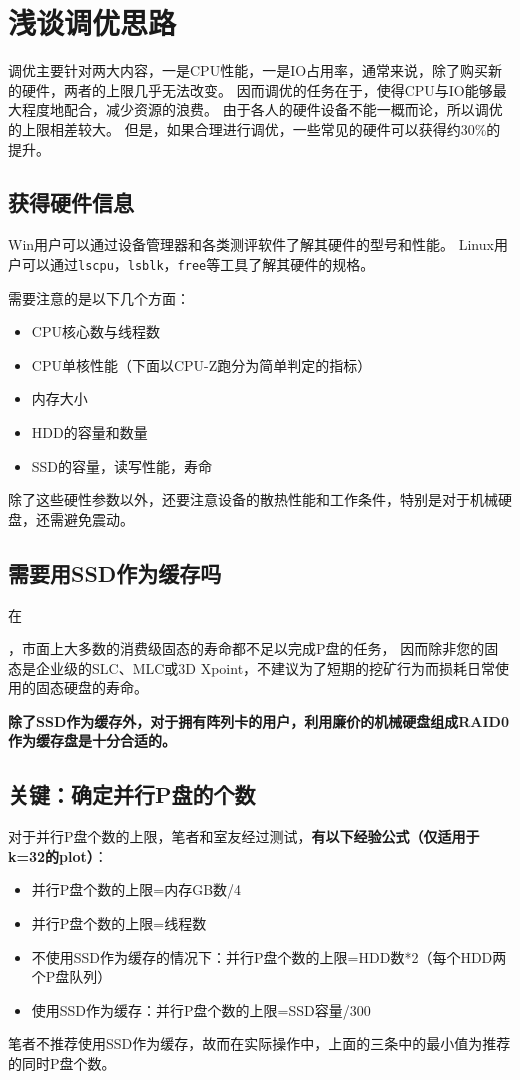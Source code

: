 \documentclass[cn,black,12pt,normal]{elegantnote}
\begin{document}
\section{浅谈调优思路}
调优主要针对两大内容，一是CPU性能，一是IO占用率，通常来说，除了购买新的硬件，两者的上限几乎无法改变。
因而调优的任务在于，使得CPU与IO能够最大程度地配合，减少资源的浪费。
由于各人的硬件设备不能一概而论，所以调优的上限相差较大。
但是，如果合理进行调优，一些常见的硬件可以获得约30\%的提升。

\subsection{获得硬件信息}
Win用户可以通过设备管理器和各类测评软件了解其硬件的型号和性能。
Linux用户可以通过\lstinline{lscpu}，\lstinline{lsblk}，\lstinline{free}等工具了解其硬件的规格。

需要注意的是以下几个方面：
\begin{itemize}
    \item CPU核心数与线程数
    \item CPU单核性能（下面以CPU-Z跑分为简单判定的指标）
    \item 内存大小
    \item HDD的容量和数量
    \item SSD的容量，读写性能，寿命
\end{itemize}

除了这些硬性参数以外，还要注意设备的散热性能和工作条件，特别是对于机械硬盘，还需避免震动。

\subsection{需要用SSD作为缓存吗}

在\date{\zhtoday}，市面上大多数的消费级固态的寿命都不足以完成P盘的任务，
因而除非您的固态是企业级的SLC、MLC或3D Xpoint，不建议为了短期的挖矿行为而损耗日常使用的固态硬盘的寿命。

\textbf{除了SSD作为缓存外，对于拥有阵列卡的用户，利用廉价的机械硬盘组成RAID0作为缓存盘是十分合适的。}

\subsection{关键：确定并行P盘的个数}

对于并行P盘个数的上限，笔者和室友经过测试，\textbf{有以下经验公式（仅适用于k=32的plot）}：
\begin{itemize}
    \item 并行P盘个数的上限=内存GB数/4
    \item 并行P盘个数的上限=线程数
    \item 不使用SSD作为缓存的情况下：并行P盘个数的上限=HDD数*2（每个HDD两个P盘队列）
    \item 使用SSD作为缓存：并行P盘个数的上限=SSD容量/300
\end{itemize}
笔者不推荐使用SSD作为缓存，故而在实际操作中，上面的三条中的最小值为推荐的同时P盘个数。
\end{document}
